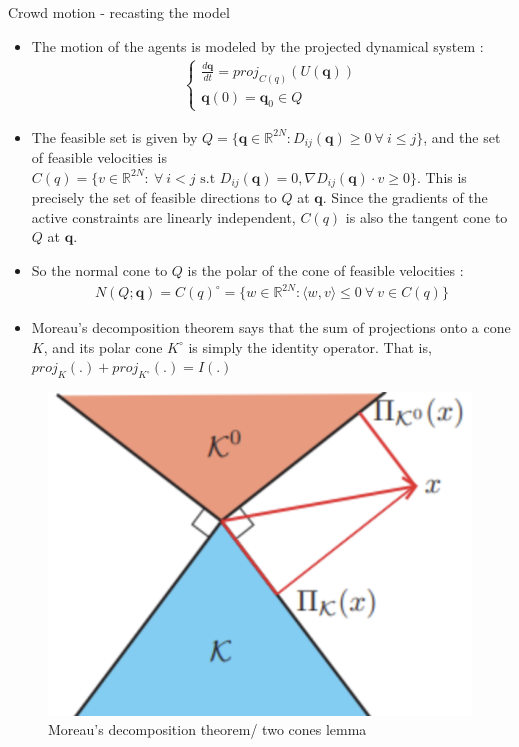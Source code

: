 \documentclass[8pt,aspectratio=169]{beamer}
\begin{document}
\begin{frame}{Crowd motion - recasting the model}
    \begin{itemize}
        \item The motion of the agents is modeled by the projected dynamical system : 
        \begin{align*}
            \begin{cases}
                \frac{d\boldsymbol{q}}{dt} = proj_{C(q)}(U(\boldsymbol{q}))\\
                \boldsymbol{q}(0) = \boldsymbol{q}_0 \in Q
            \end{cases}
        \end{align*}
        \item The feasible set is given by $Q = \{\boldsymbol{q} \in \mathbb{R}^{2N} : D_{ij}(\boldsymbol{q})\geq 0 \ \forall \ i
        \leq j\}$, and the set of feasible velocities is $C(q) = \{v \in \mathbb{R}^{2N}: \ \forall \ i<j \text{ s.t } D_{ij}(\boldsymbol{q}) = 0, \nabla D_{ij}(\boldsymbol{q})\cdot v \geq 0\}$. This is precisely the set of feasible directions to $Q$ at $\boldsymbol{q}$. Since the gradients of the active constraints are linearly independent, $C(q)$ is also the tangent cone to $Q$ at $\boldsymbol{q}$.
        \item So the normal cone to $Q$ is the polar of the cone of feasible velocities :
        \begin{align*}
            N(Q; \boldsymbol{q}) = C(q)^\circ = \{w\in \mathbb{R}^{2N} : \langle w, v\rangle \leq 0 \ \forall \ v \in C(q)\}
        \end{align*}
        \item Moreau's decomposition theorem says that the sum of projections onto a cone $K$, and its polar cone $K^\circ$ is simply the identity operator. That is, $proj_K(.) + proj_{K^\circ}(.) = I(.)$
    \end{itemize}

    \begin{figure}[h]
        \centering
        \includegraphics[width=0.15\linewidth]{decomp.png}
        \caption{Moreau's decomposition theorem/ two cones lemma}
        \label{fig:enter-label}
    \end{figure}
\end{frame}
\end{document}
